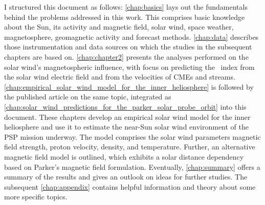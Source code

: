 I structured this document as follows: \autoref{chap:basics} lays out the fundamentals behind the problems addressed in this work. This comprises basic knowledge about the Sun, its activity and magnetic field, solar wind, space weather, magnetosphere, geomagnetic activity and forecast methods. \autoref{chap:data} describes those instrumentation and data sources on which the studies in the subsequent chapters are based on. \autoref{chap:chapter2} presents the analyses performed on the solar wind's magnetospheric influence, with focus on predicting the \Kp~index from the solar wind electric field and from the velocities of CMEs and streams. \autoref{chap:empirical_solar_wind_model_for_the_inner_heliosphere} is followed by the published article on the same topic, integrated as \autoref{chap:solar_wind_predictions_for_the_parker_solar_probe_orbit} into this document. These chapters develop an empirical solar wind model for the inner heliosphere and use it to estimate the near-Sun solar wind environment of the PSP mission underway. The model comprises the solar wind parameters magnetic field strength, proton velocity, density, and temperature. Further, an alternative magnetic field model is outlined, which exhibits a solar distance dependency based on Parker's magnetic field formulation. Eventually, \autoref{chap:summary} offers a summary of the results and gives an outlook on ideas for further studies. The subsequent \autoref{chap:appendix} contains helpful information and theory about some more specific topics.


